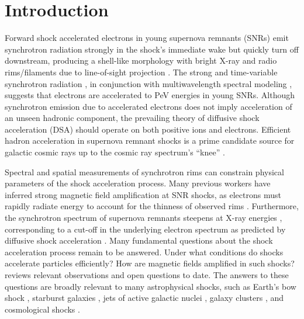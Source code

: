 \documentclass[manuscript]{aastex}  %
\begin{document}

\section{Introduction} \label{sec:intro}

Forward shock accelerated electrons in young supernova remnants (SNRs) emit
synchrotron radiation strongly in the shock's immediate wake but quickly turn
off downstream, producing a shell-like morphology with bright X-ray and radio
rims/filaments due to line-of-sight projection \citep{koyama1995}.  The strong
and time-variable synchrotron radiation \citep[e.g.,][]{uchiyama2007,
patnaude2007}, in conjunction with multiwavelength spectral modeling
\citep{aharonian2004, acero2010, ackermann2013}, suggests that electrons are
accelerated to PeV energies in young SNRs.  Although synchrotron emission due
to accelerated electrons does not imply acceleration of an unseen hadronic
component, the prevailing theory of diffusive shock acceleration (DSA) should
operate on both positive ions and electrons.  Efficient hadron acceleration in
supernova remnant shocks is a prime candidate source for galactic cosmic rays
up to the cosmic ray spectrum's ``knee'' \citep{vink2012}.

Spectral and spatial measurements of synchrotron rims can constrain physical
parameters of the shock acceleration process.  Many previous workers have
inferred strong magnetic field amplification at SNR shocks, as electrons must
rapidly radiate energy to account for the thinness of observed rims
\citep{bamba2003, vink2003, parizot2006}.  Furthermore, the synchrotron
spectrum of supernova remnants steepens at X-ray energies \citep{reynolds1999},
corresponding to a cut-off in the underlying electron spectrum as predicted by
diffusive shock acceleration \citep{webb1984}.  Many fundamental questions
about the shock acceleration process remain to be answered.  Under what
conditions do shocks accelerate particles efficiently?  How are magnetic fields
amplified in such shocks?  \citet{reynolds2008} reviews relevant observations
and open questions to date.  The answers to these questions are broadly
relevant to many astrophysical shocks, such as Earth's bow shock
\citep{ellison1990}, starburst galaxies \citep{heckman1990}, jets of active
galactic nuclei \citep{chen2014}, galaxy clusters \citep{van-weeren2010}, and
cosmological shocks \citep{ryu2008}.
\end{document}
